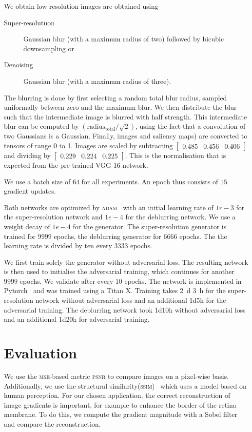 \documentclass{scrartcl}
\begin{document}
We obtain low resolution images are obtained using
\begin{description}
\item[Super-resolutuon] Gaussian blur (with a maximum radius of two) followed by bicubic downsampling or
\item[Denoising] Gaussian blur (with a maximum radius of three).
\end{description}
The blurring is done by first selecting a random total blur radius, sampled uniformally between zero and the maximum blur.
We then distribute the blur such that the intermediate image is blurred with half strength.
This intermediate blur can be computed by \( \left( \text{radius}_{\text{total}} / \sqrt{2} \right)\), using the fact that a convolution of two Gaussians is a Gaussian.
Finally, images and saliency maps) are converted to tensors of range 0 to 1.
Images are scaled by subtracting
\(
\begin{bmatrix}
 0.485 & 0.456 & 0.406 
\end{bmatrix}
\)
and dividing by
\(
\begin{bmatrix}
0.229 & 0.224& 0.225
\end{bmatrix}
\).
This is the normalisation that is expected from the pre-trained VGG-16 network.

We use a batch size of $64$ for all experiments.
An epoch thus consists of $15$ gradient updates.

Both networks are optimized by \textsc{adam}~\cite{Adam} with an initial learning rate of $1r-3$ for the super-resolution network and $1e-4$ for the deblurring network.
We use a weight decay of $1e-4$ for the generator.
The super-resolution generator is trained for $9999$ epochs, the deblurring generator for $6666$ epochs.
The the learning rate is divided by ten every $3333$ epochs.

We first train solely the generator without adversarial loss.
The resulting network is then used to initialise the adversarial training, which continues for another $9999$ epochs.
We validate after every $10$ epochs.
The network is implemented in Pytorch~\cite{Pytorch} and was trained using a Titan X.
Training takes \SI{2}{\day} \SI{3}{\hour} for the super-resolution network without adversarial loss and an additional 1d5h for the adversarial training.
The deblurring network took 1d10h without adversarial loss and an additional 1d20h for adversarial training.

\section{Evaluation}
We use the \textsc{mse}-based metric \textsc{psnr} to compare images on a pixel-wise basis.
Additionally, we use the structural similarity(\textsc{ssim})~\cite{Ssim} which uses a model based on human perception.
For our chosen application, the correct reconstruction of image gradients is important, for example to enhance the border of the retina membrane.
To do this, we compute the gradient magnitude with a Sobel filter and compare the reconstruction.
\end{document}
